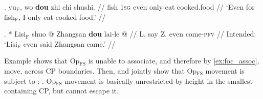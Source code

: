 \documentclass[11pt]{article}
\let\latextextsubscript\textsubscript
\let\textsubscript\latextextsubscript
\newcommand{\gap}[1]{\rule{1em}{0.4pt}\textsubscript{#1}}
\newcommand{\F}{\ensuremath{_{\mathrm{F}}}}
\newcommand{\opfs}{Op\(_{\mathrm{FS}}\)}
\begin{document}
%
\begin{paracol}{2}
 \ex. \label{ex:base_topic} \begingl
\gla yu\(_{\mathrm{F}}\), wo \textbf{dou} zhi chi shushi. //
  \glb  fish \textsc{1sg} even only eat cooked.food //
  \glft `Even for fish\F{}, I only eat cooked food.' //
\endgl
 
  \switchcolumn
 \ex. *\begingl
\gla Lisi\F{} shuo \nogloss{\I{[}CP {} } @ Zhangsan \textbf{dou} lai-le @ \nogloss{]} //
  \glb L. say Z. even come-\textsc{pfv} //
  \glft Intended: `Lisi\F{} even said Zhangsan came.' //
\endgl

\end{paracol}


Example \Last shows that \opfs{} is unable to associate, and therefore by \cref{ex:foc_assoc}, move, across CP boundaries. 
Then, \LLast and \Last jointly show that \opfs{} movement is subject to \Next:
\ex. \opfs{} movement is basically unrestricted by height in the smallest containing CP, but cannot escape it. \label{ex:loc_cons}


\end{document}
